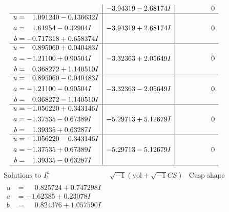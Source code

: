 \documentclass[1p]{elsarticle_modified}
\theoremstyle{definition}
\newcommand{\I}{\sqrt{-1}}
\begin{document}
$$\begin{array}{c|c|c}
 & -3.94319 - 2.68174 I & \phantom{-0.000000 } 0 \\ \hline\begin{aligned}
u &= \phantom{-}1.091240 - 0.136632 I \\
a &= \phantom{-}1.61954 - 0.32904 I \\
b &= -0.717318 + 0.658374 I\end{aligned}
 & -3.94319 + 2.68174 I & \phantom{-0.000000 } 0 \\ \hline\begin{aligned}
u &= \phantom{-}0.895060 + 0.040483 I \\
a &= -1.21100 + 0.90504 I \\
b &= \phantom{-}0.368272 + 1.140510 I\end{aligned}
 & -3.32363 + 2.05649 I & \phantom{-0.000000 } 0 \\ \hline\begin{aligned}
u &= \phantom{-}0.895060 - 0.040483 I \\
a &= -1.21100 - 0.90504 I \\
b &= \phantom{-}0.368272 - 1.140510 I\end{aligned}
 & -3.32363 - 2.05649 I & \phantom{-0.000000 } 0 \\ \hline\begin{aligned}
u &= -1.056220 + 0.343146 I \\
a &= -1.37535 - 0.67389 I \\
b &= \phantom{-}1.39335 + 0.63287 I\end{aligned}
 & -5.29713 + 5.12679 I & \phantom{-0.000000 } 0 \\ \hline\begin{aligned}
u &= -1.056220 - 0.343146 I \\
a &= -1.37535 + 0.67389 I \\
b &= \phantom{-}1.39335 - 0.63287 I\end{aligned}
 & -5.29713 - 5.12679 I & \phantom{-0.000000 } 0\\
 \hline 
 \end{array}$$\newpage$$\begin{array}{c|c|c}  
\text{Solutions to }I^u_{1}& \I (\text{vol} + \sqrt{-1}CS) & \text{Cusp shape}\\
 \hline 
\begin{aligned}
u &= \phantom{-}0.825724 + 0.747298 I \\
a &= -1.62385 + 0.23078 I \\
b &= \phantom{-}0.824376 + 1.057590 I\end{aligned}

\end{array}$$
\end{document}
